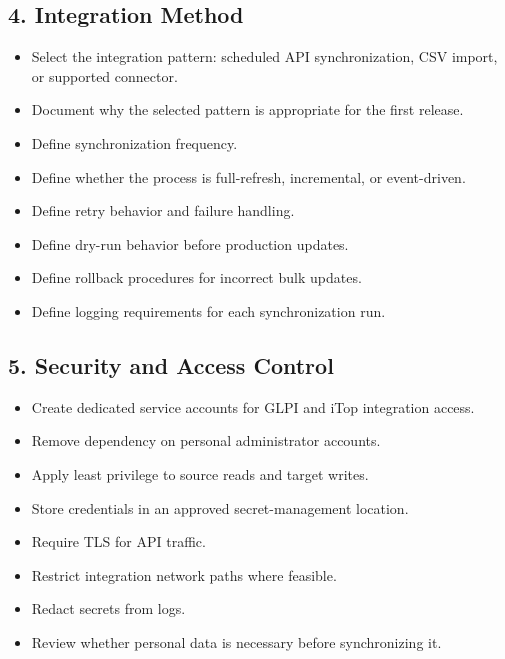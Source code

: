 \documentclass[11pt]{article}
\newcommand{\checkbox}{\fbox{\rule{0pt}{1.1ex}\rule{1.1ex}{0pt}}}
\begin{document}
\subsection{4. Integration Method}
\begin{itemize}
  \item[\checkbox] Select the integration pattern: scheduled API synchronization, CSV import, or supported connector.
  \item[\checkbox] Document why the selected pattern is appropriate for the first release.
  \item[\checkbox] Define synchronization frequency.
  \item[\checkbox] Define whether the process is full-refresh, incremental, or event-driven.
  \item[\checkbox] Define retry behavior and failure handling.
  \item[\checkbox] Define dry-run behavior before production updates.
  \item[\checkbox] Define rollback procedures for incorrect bulk updates.
  \item[\checkbox] Define logging requirements for each synchronization run.
\end{itemize}

\subsection{5. Security and Access Control}
\begin{itemize}
  \item[\checkbox] Create dedicated service accounts for GLPI and iTop integration access.
  \item[\checkbox] Remove dependency on personal administrator accounts.
  \item[\checkbox] Apply least privilege to source reads and target writes.
  \item[\checkbox] Store credentials in an approved secret-management location.
  \item[\checkbox] Require TLS for API traffic.
  \item[\checkbox] Restrict integration network paths where feasible.
  \item[\checkbox] Redact secrets from logs.
  \item[\checkbox] Review whether personal data is necessary before synchronizing it.
\end{itemize}
\end{document}
